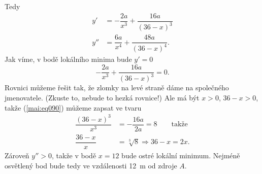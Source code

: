 \begin{mathexam}
\begin{equation*}
  \end{equation*}  
  Tedy 
  \begin{align*}
    y'  &= -\dfrac{2a}{x^3} + \dfrac{16a}{(36 - x)^3} \\
    y'' &=  \dfrac{6a}{x^4} + \dfrac{48a}{(36 - x)^4}. 
  \end{align*}
  Jak víme, v bodě lokálního minima bude \(y' = 0\)
  \begin{equation}\label{mai:eq090}
    -\dfrac{2a}{x^3} + \dfrac{16a}{(36 - x)^3} = 0.
  \end{equation}
  Rovnici můžeme řešit tak, že zlomky na levé straně dáme na společného jmenovatele. (Zkuste to,
  nebude to hezká rovnice!) Ale má být \(x > 0\), \(36 - x > 0\), takže (\ref{mai:eq090}) můžeme
  zapsat ve tvaru
  \begin{align*}
    \dfrac{(36 - x)^3}{x^3} &= -\dfrac{16a}{2a} = 8 \qquad\text{takže}      \\
    \dfrac{36 - x}{x}       &= \sqrt[3]{8} \Rightarrow 36 - x = 2x.
  \end{align*}
  Zároveň \(y''>0\), takže v bodě \(x=12\) bude ostré lokální minimum. Nejméně osvětlený bod bude
  tedy ve vzdálenosti \SI{12}{\m} od zdroje \(A\).

  {\centering
  \captionsetup{type=figure}
  \label{mai:fig064}
  \par}   
\end{mathexam}
